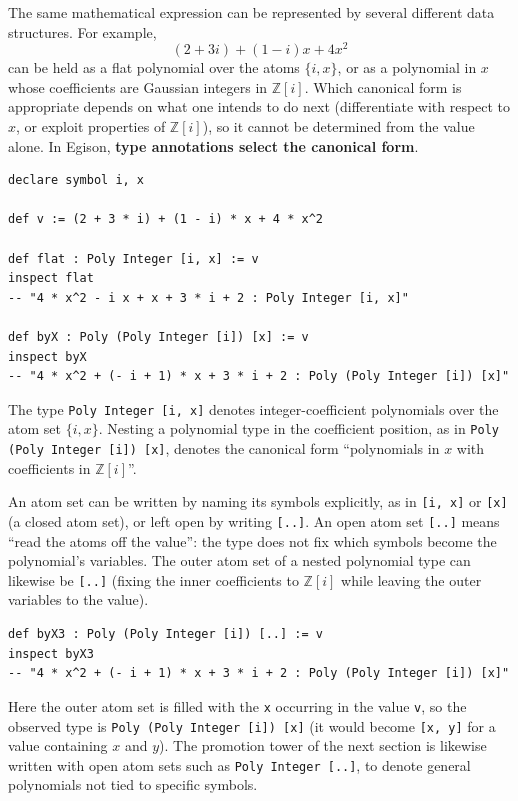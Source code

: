 The same mathematical expression can be represented by several different data structures.
For example,
\[ (2+3i) + (1-i)x + 4x^2 \]
can be held as a flat polynomial over the atoms $\{i, x\}$, or as a polynomial in $x$ whose coefficients are Gaussian integers in $\mathbb{Z}[i]$.
Which canonical form is appropriate depends on what one intends to do next (differentiate with respect to $x$, or exploit properties of $\mathbb{Z}[i]$), so it cannot be determined from the value alone.
In Egison, \textbf{type annotations select the canonical form}.
\begin{lstlisting}[language=egison,numbers=none]
declare symbol i, x

def v := (2 + 3 * i) + (1 - i) * x + 4 * x^2

def flat : Poly Integer [i, x] := v
inspect flat
-- "4 * x^2 - i x + x + 3 * i + 2 : Poly Integer [i, x]"

def byX : Poly (Poly Integer [i]) [x] := v
inspect byX
-- "4 * x^2 + (- i + 1) * x + 3 * i + 2 : Poly (Poly Integer [i]) [x]"
\end{lstlisting}
The type \lstinline{Poly Integer [i, x]} denotes integer-coefficient polynomials over the atom set $\{i, x\}$.
Nesting a polynomial type in the coefficient position, as in \lstinline{Poly (Poly Integer [i]) [x]}, denotes the canonical form ``polynomials in $x$ with coefficients in $\mathbb{Z}[i]$''.

An atom set can be written by naming its symbols explicitly, as in \lstinline{[i, x]} or \lstinline{[x]} (a closed atom set), or left open by writing \lstinline{[..]}.
An open atom set \lstinline{[..]} means ``read the atoms off the value'': the type does not fix which symbols become the polynomial's variables.
The outer atom set of a nested polynomial type can likewise be \lstinline{[..]} (fixing the inner coefficients to $\mathbb{Z}[i]$ while leaving the outer variables to the value).
\begin{lstlisting}[language=egison,numbers=none]
def byX3 : Poly (Poly Integer [i]) [..] := v
inspect byX3
-- "4 * x^2 + (- i + 1) * x + 3 * i + 2 : Poly (Poly Integer [i]) [x]"
\end{lstlisting}
Here the outer atom set is filled with the \lstinline{x} occurring in the value \lstinline{v}, so the observed type is \lstinline{Poly (Poly Integer [i]) [x]} (it would become \lstinline{[x, y]} for a value containing $x$ and $y$).
The promotion tower of the next section is likewise written with open atom sets such as \lstinline{Poly Integer [..]}, to denote general polynomials not tied to specific symbols.

